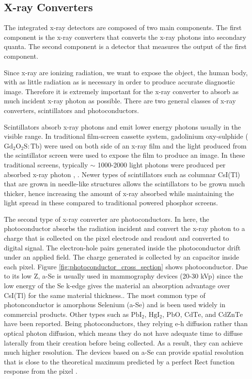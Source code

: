 \subsection{X-ray Converters}
The integrated x-ray detectors are composed of two main components.  The first component is the x-ray converters that converts the x-ray photons into secondary quanta.  The second component is a detector that measures the output of the first component.

Since x-ray are ionizing radiation, we want to expose the object, the human body, with as little radiation as is necessary in order to produce accurate diagnostic image.  Therefore it is extremely important for the x-ray converter to absorb as much incident x-ray photon as possible.  There are two general classes of x-ray converters, scintillators and photoconductors. 

Scintillators absorb x-ray photons and emit lower energy photons usually in the visible range.  In traditional film-screen cassette system, gadolinium oxy-sulphide ($\mathrm{Gd_2O_2S:Tb}$) were used on both side of an x-ray film and the light produced from the scintillator screen were used to expose the film to produce an image.  In these traditional screens, typically $\sim$ 1000-2000 light photons were produced per absorbed x-ray photon \cite{trauernicht1988}, \cite{trauernicht1990}. Newer types of scintillators such as columnar CsI(Tl) that are grown in needle-like structures allows the scintillators to be grown much thicker, hence increasing the amount of x-ray absorbed while maintaining the light spread in these compared to traditional powered phosphor screens.

The second type of x-ray converter are photoconductors.  In here,  the photoconductor absorbs the radiation incident and convert the x-ray photon to a charge that is collected on the pixel electrode and readout and converted to digital signal.  The electron-hole pairs generated inside the photoconductor drift under an applied field.  The charge generated is collected by an capacitor inside each pixel. Figure \ref{fig:photoconductor_cross_section} shows photoconductor.  Due to its low Z, a-Se is usually used in mammography devices (20-30 kVp) since the low energy of the Se k-edge gives the material an absorption advantage over CsI(Tl) for the same material thickness.\cite{Yorkston2007}.  The most common type of photonconductor is amorphous Selenium (a-Se) and is been used widely in commercial products.  Other types such as $\mathrm{PbI_2}$, $\mathrm{HgI_2}$, $\mathrm{PbO}$, $\mathrm{CdTe}$, and $\mathrm{CdZnTe}$ have been reported.  Being photoconductors, they relying e-h diffusion rather than optical photon diffusion, which means they do not have adequate time to diffuse laterally from their creation before being collected.  As a result, they can achieve much higher resolution.  The devices based on a-Se can provide spatial resolution that is close to the theoretical maximum predicted by a perfect Rect function response from the pixel \cite{hunt5030}. 

